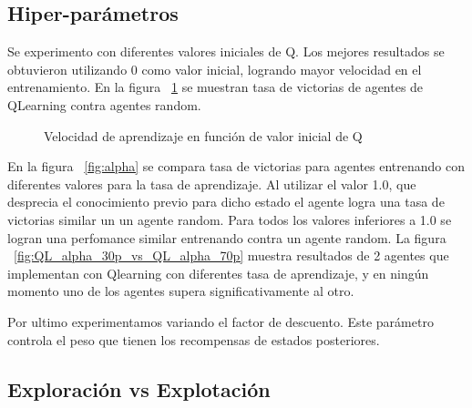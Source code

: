 
\subsection{Hiper-parámetros}

Se experimento con diferentes valores iniciales de Q. Los mejores resultados se obtuvieron utilizando 0 como valor inicial, logrando mayor velocidad en el entrenamiento. En la figura ~\ref{fig:qinit} se muestran tasa de victorias de agentes de QLearning contra agentes random.   
\begin{figure}[H]
\begin{center}
\caption{Velocidad de aprendizaje en función de valor inicial de Q}
\label{fig:qinit}
\end{center}
\end{figure}


En la figura ~\ref{fig:alpha} se compara tasa de victorias para agentes entrenando con diferentes valores para la tasa de aprendizaje. Al utilizar el valor 1.0, que desprecia el conocimiento previo para dicho estado el agente logra una tasa de victorias similar un un agente random. Para todos los valores inferiores a 1.0 se logran una perfomance similar entrenando contra un agente random. La figura ~\ref{fig:QL_alpha_30p_vs_QL_alpha_70p} muestra resultados de 2 agentes que implementan con Qlearning con diferentes tasa de aprendizaje, y en ningún momento uno de los agentes supera significativamente al otro. 
 
\begin{figure}[H]
\begin{center}
\caption{}
\label{fig:alphag}
\end{center}
\end{figure}

Por ultimo experimentamos variando el factor de descuento. Este parámetro controla el peso que tienen los recompensas de estados posteriores. 


\subsection{Exploración vs Explotación}

